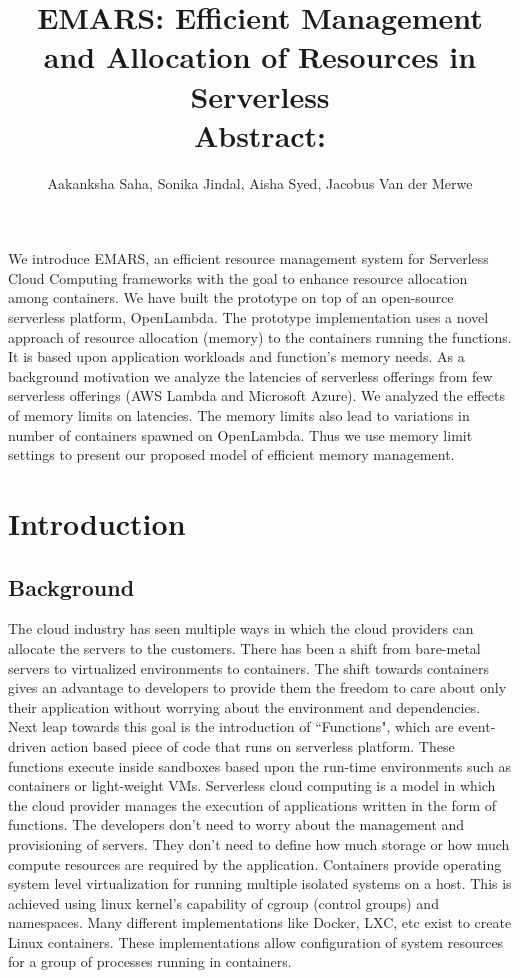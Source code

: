 \documentclass[letterpaper,twocolumn,10pt]{article}
\title{EMARS: Efficient Management and Allocation of Resources in Serverless\\}
\author{Aakanksha Saha, Sonika Jindal, Aisha Syed, Jacobus Van der Merwe}
\date{}
\affil{University of Utah \footnote{Aiming for HotCloud'18 \\(https://www.usenix.org/conference/hotcloud18)}}
\begin{document}
\maketitle
\title{\textbf{Abstract:}} We introduce EMARS, an efficient resource management system for Serverless Cloud Computing frameworks with the goal to enhance resource allocation among containers. We have built the prototype on top of an open-source serverless platform, OpenLambda. The prototype implementation uses a novel approach of resource allocation (memory) to the containers running the functions. It is based upon application workloads and function's memory needs. As a background motivation we analyze the latencies of serverless offerings from few serverless offerings (AWS Lambda and Microsoft Azure). We analyzed the effects of memory limits on latencies. The memory limits also lead to variations in number of containers spawned on OpenLambda. Thus we use memory limit settings to present our proposed model of efficient memory management. 

\section{Introduction}
\label{sec:first}
\subsection{Background}
The cloud industry has seen multiple ways in which the cloud providers can allocate the servers to the customers. There has been a shift from bare-metal servers to virtualized environments to containers. The shift towards containers gives an advantage to developers to provide them the freedom to care about only their application without worrying about the environment and dependencies. Next leap towards this goal is the introduction of ``Functions", which are event-driven action based piece of code that runs on serverless platform. These functions execute inside sandboxes based upon the run-time environments such as containers or light-weight VMs. Serverless cloud computing is a model in which the cloud provider manages the execution of applications written in the form of functions. The developers don't need to worry about the management and provisioning of servers. They don't need to define how much storage or how much compute resources are required by the application. Containers provide operating system level virtualization for running multiple isolated systems on a host. This is achieved using linux kernel’s capability of cgroup\cite{cgroup} (control groups) and namespaces. Many different implementations like Docker\cite{docker}, LXC\cite{lxc}, etc exist to create Linux containers. These implementations allow configuration of system resources for a group of processes running in containers.
\end{document}
